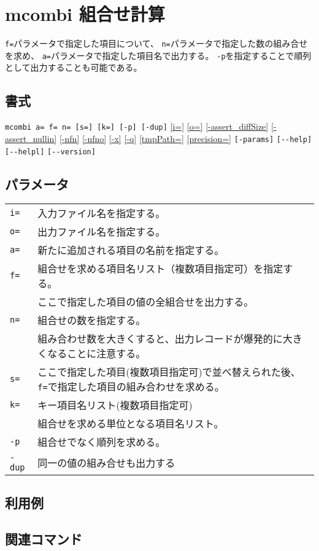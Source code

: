 
%

\section{mcombi 組合せ計算\label{sect:mcombi}}
\verb|f=|パラメータで指定した項目について、
\verb|n=|パラメータで指定した数の組み合せを求め、
\verb|a=|パラメータで指定した項目名で出力する。
\verb|-p|を指定することで順列として出力することも可能である。

\subsection*{書式}
\verb/mcombi a= f= n= [s=] [k=] [-p] [-dup]/
\hyperref[sect:option_i]{[i=]}
\hyperref[sect:option_o]{[o=]}
\hyperref[sect:option_assert_diffSize]{[-assert\_diffSize]}
\hyperref[sect:option_assert_nullin]{[-assert\_nullin]}
\hyperref[sect:option_nfn]{[-nfn]} 
\hyperref[sect:option_nfno]{[-nfno]}  
\hyperref[sect:option_x]{[-x]}
\hyperref[sect:option_q]{[-q]}
\hyperref[sect:option_option_tmppath]{[tmpPath=]}
\hyperref[sect:option_precision]{[precision=]}
\verb|[-params]|
\verb|[--help]|
\verb|[--helpl]|
\verb|[--version]|\\

\subsection*{パラメータ}
\begin{table}[htbp]
{\small
\begin{tabular}{ll}
\verb|i=|    & 入力ファイル名を指定する。\\
\verb|o=|    & 出力ファイル名を指定する。\\
\verb|a=|    & 新たに追加される項目の名前を指定する。\\
\verb|f=|    & 組合せを求める項目名リスト（複数項目指定可）を指定する。\\
             & ここで指定した項目の値の全組合せを出力する。\\
\verb|n=|    & 組合せの数を指定する。\\
             & 組み合わせ数を大きくすると、出力レコードが爆発的に大きくなることに注意する。\\
\verb|s=|    & ここで指定した項目(複数項目指定可)で並べ替えられた後、\verb|f=|で指定した項目の組み合わせを求める。\\
\verb|k=|    & キー項目名リスト(複数項目指定可)\\
             & 組合せを求める単位となる項目名リスト。\\
\verb|-p|    & 組合せでなく順列を求める。\\
\verb|-dup|  & 同一の値の組み合せも出力する\\
\end{tabular} 
}
\end{table} 

\subsection*{利用例}

\subsection*{関連コマンド}

%
